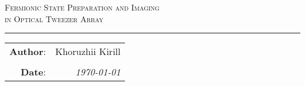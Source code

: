 
\begin{center}
    \LARGE \textsc{Fermionic State Preparation and Imaging \\ in Optical Tweezer Array}
\end{center}

\hrule

\phantom{42}

\begin{flushright}
    \begin{tabular}{rr}
        \textbf{Author}: 
        & Khoruzhii Kirill \\
        & \\
        \textbf{Date}: &
        \textit{\today}\\
    \end{tabular}
\end{flushright}

\thispagestyle{empty}

\tableofcontents








\newpage
